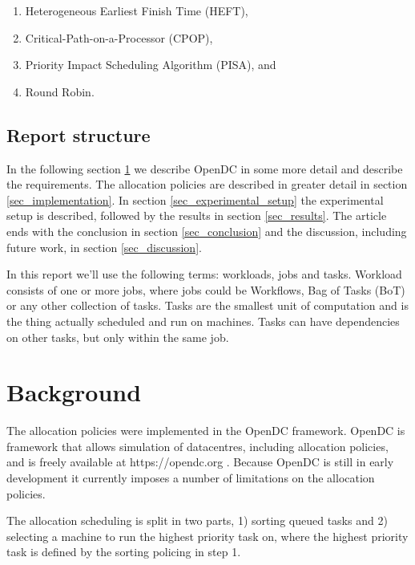 \documentclass[twocolumn,a4]{scrartcl}
\begin{document}
\begin{enumerate}
  \item Heterogeneous Earliest Finish Time (HEFT), \cite{DBLP:journals/tpds/TopcuogluHW02}
  \item Critical-Path-on-a-Processor (CPOP), \cite{DBLP:conf/hcw/TopcuogluHW99}
  \item Priority Impact Scheduling Algorithm (PISA), \cite{6174855} and
  \item Round Robin. \cite{DBLP:journals/jacm/Rasch70}
\end{enumerate}

\subsection{Report structure} \label{sec_structure}

In the following section \ref{sec_background} we describe OpenDC in some more detail and describe the requirements. The allocation policies are described in greater detail in section \ref{sec_implementation}. In section \ref{sec_experimental_setup} the experimental setup is described, followed by the results in section \ref{sec_results}. The article ends with the conclusion in section \ref{sec_conclusion} and the discussion, including future work, in section \ref{sec_discussion}.

In this report we'll use the following terms: workloads, jobs and tasks. Workload consists of one or more jobs, where jobs could be Workflows, Bag of Tasks (BoT) or any other collection of tasks. Tasks are the smallest unit of computation and is the thing actually scheduled and run on machines. Tasks can have dependencies on other tasks, but only within the same job.

\section{Background} \label{sec_background}

The allocation policies were implemented in the OpenDC framework. OpenDC is framework that allows simulation of datacentres, including allocation policies, and is freely available at https://opendc.org \cite{DBLP:conf/ispdc/IosupABBENOTVV17}. Because OpenDC is still in early development it currently imposes a number of limitations on the allocation policies.

The allocation scheduling is split in two parts, 1) sorting queued tasks and 2) selecting a machine to run the highest priority task on, where the highest priority task is defined by the sorting policing in step 1.
\end{document}
